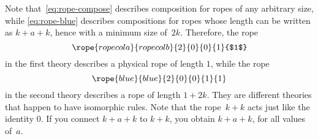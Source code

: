 \begin{solution}
    Note that~\cref{eq:rope-compose} describes composition for ropes of any arbitrary size, while \cref{eq:rope-blue} describes compositions for ropes whose length can be written as $k+a+k$, hence with a minimum size of~$2k$.
    Therefore, the rope
    \begin{equation*}
        \rope{ropecola}{ropecolb}{2}{0}{0}{1}{$1$}
    \end{equation*}
    in the first theory describes a physical rope of length $1$, while the rope
    \begin{equation*}
        \rope{blue}{blue}{2}{0}{0}{1}{1}
    \end{equation*}
    in the second theory describes a rope of length $1+2k$.
    They are different theories that happen to have isomorphic rules.
    Note that the rope~$k+k$ acts just like the identity 0.
    If you connect $k + a + k$ to $k+k$, you obtain $k + a + k$, for all values of~$a$.
\end{solution}
%
%
%
%
%
